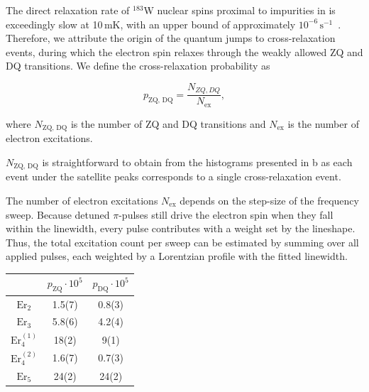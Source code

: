 The direct relaxation rate of $^{183}$W nuclear spins proximal to \Er impurities in \Ca is exceedingly slow at 10\,mK, with an upper bound of approximately $10^{-6}\,\mathrm{s}^{-1}$~. Therefore, we attribute the origin of the quantum jumps to cross-relaxation events, during which the electron spin relaxes through the weakly allowed ZQ and DQ transitions. We define the cross-relaxation probability as

\begin{equation}
    p_\text{ZQ, DQ} = \frac{N_{ZQ, DQ}}{N_\text{ex}}, 
\end{equation}

where $N_\text{ZQ, DQ}$ is the number of ZQ and DQ transitions and $N_\text{ex}$ is the number of electron excitations.

$N_\text{ZQ, DQ}$ is straightforward to obtain from the histograms presented in b as each event under the satellite peaks corresponds to a single cross-relaxation event.

The number of electron excitations $N_\text{ex}$ depends on the step-size of the frequency sweep. Because detuned $\pi$-pulses still drive the electron spin when they fall within the linewidth, every pulse contributes with a weight set by the lineshape. Thus, the total excitation count per sweep can be estimated by summing over all applied pulses, each weighted by a Lorentzian profile with the fitted linewidth. 

\begin{margintable}
\begin{tabular}{|c|c|c|}
\hline
                                & $p_{\mathrm{ZQ}} \cdot 10^{5}$   & $p_{\mathrm{DQ}} \cdot 10^{5}$   \\ \hline
\textbf{$\mathrm{Er}_2$}        & 1.5(7)       & 0.8(3)       \\ \hline
\textbf{$\mathrm{Er}_3$}        & 5.8(6)       & 4.2(4)       \\ \hline
\textbf{$\mathrm{Er}_4^{(1)}$}  & 18(2)        & 9(1)         \\ \hline
\textbf{$\mathrm{Er}_4^{(2)}$}  & 1.6(7)       & 0.7(3)       \\ \hline
\textbf{$\mathrm{Er}_5$}        & 24(2)        & 24(2)        \\ \hline
\end{tabular}
\caption[Cross-relaxation probability]{Cross-relaxation probability measured through the time-trace analysis. The uncertainties of the cross-relaxation probabilities are estimated through the Wald method with a 1 sigma confidence interval.}
\end{margintable}

